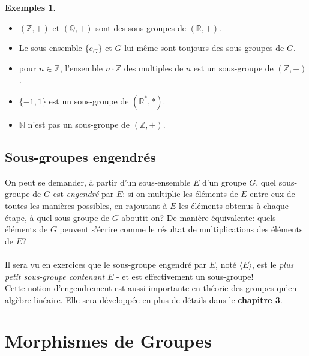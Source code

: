 \documentclass[oneside,12pt,french,table]{book}
\newcommand{\Z}{\mathbb{Z}}
\theoremstyle{definition}
\theoremstyle{definition}
\newtheorem*{examples}{Exemples}
\theoremstyle{definition}
\begin{document}
\begin{examples} \hspace{1em}
\begin{itemize}
    \item $(\mathbb{Z}, +)$ et $(\mathbb{Q}, +)$ sont des sous-groupes de $(\mathbb{R}, +)$.
    \item Le sous-ensemble $\{e_G\}$ et $G$ lui-même sont toujours des sous-groupes de $G$.
    \item pour $n \in \mathbb{Z}$, l'ensemble $n \cdot \Z$ des multiples de $n$ est un sous-groupe de $(\mathbb{Z}, +)$.
    \item $\{-1, 1\}$ est un sous-groupe de $(\mathbb{R}^*,*)$.
    \item $\mathbb{N}$ n'est pas un sous-groupe de $(\mathbb{Z}, +)$.
\end{itemize}
\end{examples}

\subsection{Sous-groupes engendrés}
On peut se demander, à partir d'un sous-ensemble $E$ d'un groupe $G$, quel sous-groupe de $G$ est \textit{engendré} par $E$: si on multiplie les éléments de $E$ entre eux de toutes les manières possibles, en rajoutant à $E$ les éléments obtenus à chaque étape, à quel sous-groupe de $G$ aboutit-on? De manière équivalente: quels éléments de $G$ peuvent s'écrire comme le résultat de multiplications des éléments de $E$? \\ \\
Il sera vu en exercices que le sous-groupe engendré par $E$, noté $\langle E \rangle$, est le \textit{plus petit sous-groupe contenant} $E$ - et est effectivement un sous-groupe! \\
Cette notion d'engendrement est aussi importante en théorie des groupes qu'en algèbre linéaire. Elle sera développée en plus de détails dans le \textbf{chapitre 3}.
\section{Morphismes de Groupes}
\end{document}
